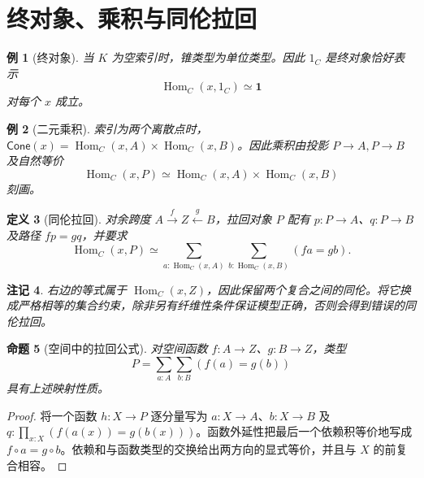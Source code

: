 \documentclass[12pt,oneside,openany,fontset=none]{ctexbook}
\theoremstyle{cn}
\newtheorem{definition}{定义}[chapter]
\newtheorem{example}[definition]{例}
\newtheorem{proposition}[definition]{命题}
\newtheorem{remark}[definition]{注记}
\numberwithin{equation}{chapter}
\newcommand{\Hom}{\operatorname{Hom}}
\newcommand{\one}{\mathbf 1}
\begin{document}
\section{终对象、乘积与同伦拉回}
\begin{example}[终对象]
当 $K$ 为空索引时，锥类型为单位类型。因此 $1_C$ 是终对象恰好表示
\[
\Hom_C(x,1_C)\simeq\one
\]
对每个 $x$ 成立。
\end{example}
\begin{example}[二元乘积]
索引为两个离散点时，$\mathsf{Cone}(x)=\Hom_C(x,A)\times\Hom_C(x,B)$。因此乘积由投影 $P\to A,P\to B$ 及自然等价
\[
\Hom_C(x,P)\simeq
\Hom_C(x,A)\times\Hom_C(x,B)
\]
刻画。
\end{example}
\begin{definition}[同伦拉回]
对余跨度 $A\xrightarrow f Z\xleftarrow g B$，拉回对象 $P$ 配有 $p:P\to A$、$q:P\to B$ 及路径 $fp=gq$，并要求
\[
\Hom_C(x,P)\simeq
\sum_{a:\Hom_C(x,A)}\sum_{b:\Hom_C(x,B)}
(fa=gb).
\]
\end{definition}
\begin{remark}
右边的等式属于 $\Hom_C(x,Z)$，因此保留两个复合之间的同伦。将它换成严格相等的集合约束，除非另有纤维性条件保证模型正确，否则会得到错误的同伦拉回。
\end{remark}
\begin{proposition}[空间中的拉回公式]
对空间函数 $f:A\to Z$、$g:B\to Z$，类型
\[
P=\sum_{a:A}\sum_{b:B}(f(a)=g(b))
\]
具有上述映射性质。
\end{proposition}
\begin{proof}
将一个函数 $h:X\to P$ 逐分量写为 $a:X\to A$、$b:X\to B$ 及 $q:\prod_{x:X}(f(a(x))=g(b(x)))$。函数外延性把最后一个依赖积等价地写成 $f\circ a=g\circ b$。依赖和与函数类型的交换给出两方向的显式等价，并且与 $X$ 的前复合相容。
\end{proof}
\end{document}
